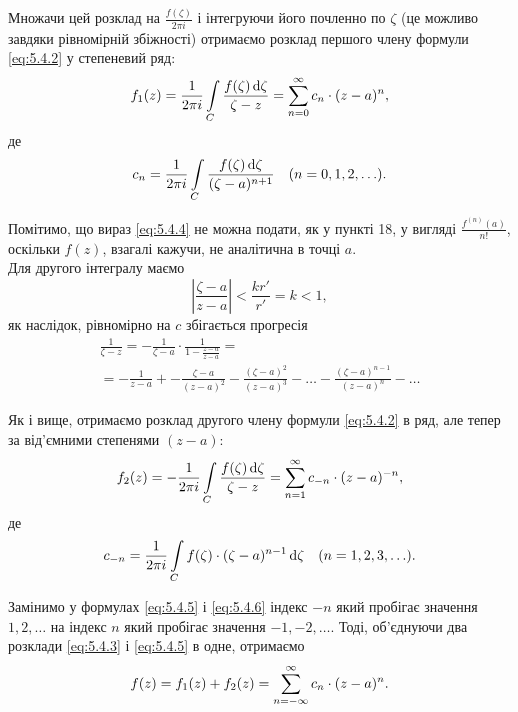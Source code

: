 Множачи цей розклад на $\frac{f(\zeta)}{2 \pi i}$ і інтегруючи його почленно по $\zeta$ (це можливо завдяки рівномірній збіжності) отримаємо розклад першого члену формули \eqref{eq:5.4.2} у степеневий ряд:
\begin{equation}
	\label{eq:5.4.3}
	f_1(z) = \frac{1}{2 \pi i} \displaystyle\int\limits_C \frac{f(\zeta) \mathop{}\!\mathrm{d} \zeta}{\zeta - z} = \displaystyle\sum\limits_{n = 0}^\infty c_n \cdot (z - a)^n,
\end{equation}
де
\begin{equation}
	\label{eq:5.4.4}
	c_n = \frac{1}{2 \pi i} \displaystyle\int\limits_C \frac{f(\zeta) \mathop{}\!\mathrm{d} \zeta}{(\zeta - a)^{n + 1}} \quad (n = 0, 1, 2, \ldots).
\end{equation}

Помітимо, що вираз \eqref{eq:5.4.4} не можна подати, як у пункті 18, у вигляді $\frac{f^{(n)}(a)}{n!}$, оскільки $f(z)$, взагалі кажучи, не аналітична в точці $a$. \\

Для другого інтегралу маємо
\begin{equation*}
	\left| \frac{\zeta - a}{z - a} \right| < \frac{k r'}{r'} = k < 1,
\end{equation*}
як наслідок, рівномірно на $c$ збігається прогресія
\begin{multline*}
	\frac{1}{\zeta - z} = - \frac{1}{\zeta - a} \cdot \frac{1}{1 - \frac{z - a}{z - a}} = \\ = - \frac{1}{z - a} +- \frac{\zeta - a}{(z - a)^2} - \frac{(\zeta - a)^2}{(z - a)^3} - \ldots - \frac{(\zeta - a)^{n - 1}}{(z - a)^n} - \ldots
\end{multline*}

Як і вище, отримаємо розклад другого члену формули \eqref{eq:5.4.2} в ряд, але тепер за від'ємними степенями $(z - a)$:
\begin{equation}
	\label{eq:5.4.5}
	f_2(z) = - \frac{1}{2 \pi i} \displaystyle\int\limits_C \frac{f(\zeta) \mathop{}\!\mathrm{d} \zeta}{\zeta - z} = \displaystyle\sum\limits_{n = 1}^\infty c_{-n} \cdot (z - a)^{-n},
\end{equation}
де
\begin{equation}
	\label{eq:5.4.6}
	c_{-n} = \frac{1}{2 \pi i} \displaystyle\int\limits_C f(\zeta) \cdot (\zeta - a)^{n - 1} \mathop{}\!\mathrm{d} \zeta \quad (n = 1, 2, 3, \ldots).
\end{equation}

Замінимо у формулах \eqref{eq:5.4.5} і \eqref{eq:5.4.6} індекс $-n$ який пробігає значення $1, 2, \ldots$ на індекс $n$ який пробігає значення $-1, -2, \ldots$. Тоді, об'єднуючи два розклади \eqref{eq:5.4.3} і \eqref{eq:5.4.5} в одне, отримаємо
\begin{equation}
	\label{eq:5.4.7}
	f(z) = f_1(z) + f_2(z) = \displaystyle\sum\limits_{n = - \infty}^\infty c_n \cdot (z - a)^n.
\end{equation}

